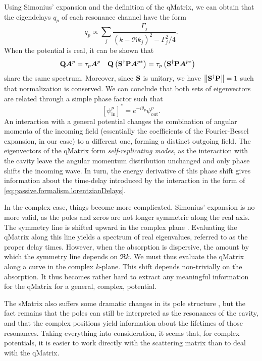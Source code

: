 Using Simonius' expansion and the definition of the \gls{qMatrix}, we can obtain that
the eigendelays $q_p$ of each resonance channel have the form
  \begin{equation}
   \label{eq:passive.formalism.lorentzianDelays}
   q_p \propto \sum_j \frac{\Gamma_j}{\left(k-\Re{k_j}\right)^2-\Gamma_j^2/4}.
  \end{equation}
When the potential is real, it can be shown that 
	\begin{align}
		\mathbf{Q}\boldsymbol{A}^p	&= \tau_p\boldsymbol{A}^p &
		\mathbf{Q}\left(\mathbf{S}^\dagger\mathbf{P}\boldsymbol{A}^{p*}\right)	&=\tau_p\left(\mathbf{S}^\dagger\mathbf{P}\boldsymbol{A}^{p*}\right)
	\end{align}
share the same spectrum. Moreover, since $\mathbf{S}$ is unitary, we have 
$\left\|\mathbf{S^\dagger P}\right\|=1$ such that normalization is conserved. 
We can conclude that both sets of eigenvectors are related through a simple
phase factor such that
	\begin{equation}
		\left[\psi^p_\text{in}\right]^* = e^{-i\theta_p}\psi^p_\text{out}.
	\end{equation}
An interaction with a general potential changes the combination
of angular momenta of the incoming field (essentially the coefficients
of the Fourier-Bessel expansion, in our case) to a different one, 
forming a distinct outgoing field. The eigenvectors of the \gls{qMatrix}
form \textit{self-replicating modes}, as the interaction with the cavity
leave the angular momentum distribution unchanged and only phase shifts
the incoming wave. In turn, the energy derivative of this phase shift
gives information about the time-delay introduced 
by the interaction in the form of \eqref{eq:passive.formalism.lorentzianDelays}.

In the complex case, things become more complicated. Simonius' 
expansion is no more valid, as the poles and zeros are not 
longer symmetric along the real axis. The symmetry line
is shifted upward in the complex plane \cite{SAV2003,FYO2005}. 
Evaluating the \gls{qMatrix} along this line yields
a spectrum of real eigenvalues, referred to as the proper delay times. 
However, when the absorption is dispersive, the amount by which the symmetry
line depends on $\Re{k}$. We must thus evaluate the \gls{qMatrix} along
a curve in the complex $k$-plane. This shift depends non-trivially
on the absorption. It thus becomes rather hard to extract any meaningful
information for the \gls{qMatrix} for a general, complex, potential. 

\label{sec:passive.formalism.SpoleStructure}The \gls{sMatrix} also suffers some dramatic changes in its pole structure
\cite{JOF1973,KOK1981}, but the fact remains that the poles can still be
interpreted as the resonances of the cavity, and that the complex positions
yield information about the lifetimes of those resonances. Taking everything
into consideration, it seems that, for complex potentials, it is easier to 
work directly with the scattering matrix than to deal with the \gls{qMatrix}.

